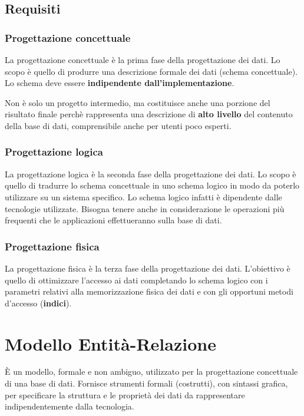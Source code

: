 \documentclass[a4paper]{article}
\begin{document}
\subsection{Requisiti}
\subsubsection{Progettazione concettuale}
La progettazione concettuale è la prima fase della progettazione dei dati. Lo scopo è
quello di produrre una descrizione formale dei dati (schema concettuale). Lo schema
deve essere \textbf{indipendente dall'implementazione}.

\vspace{1em}
\noindent
Non è solo un progetto intermedio, ma costituisce anche una porzione del risultato finale
perchè rappresenta una descrizione di \textbf{alto livello} del contenuto della base di
dati, comprensibile anche per utenti poco esperti.

\subsubsection{Progettazione logica}
La progettazione logica è la seconda fase della progettazione dei dati. Lo scopo è
quello di tradurre lo schema concettuale in uno schema logico in modo da poterlo
utilizzare su un sistema specifico. Lo schema logico infatti è dipendente dalle
tecnologie utilizzate. Bisogna tenere anche in considerazione le operazioni più
frequenti che le applicazioni effettueranno sulla base di dati.

\subsubsection{Progettazione fisica}
La progettazione fisica è la terza fase della progettazione dei dati. L'obiettivo è quello
di ottimizzare l'accesso ai dati completando lo schema logico con i parametri relativi
alla memorizzazione fisica dei dati e con gli opportuni metodi d'accesso (\textbf{indici}).

\section{Modello Entità-Relazione}
È un modello, formale e non ambiguo, utilizzato per la progettazione concettuale di una
base di dati. Fornisce strumenti formali (costrutti), con sintassi grafica, per specificare la
struttura e le proprietà dei dati da rappresentare indipendentemente dalla tecnologia.
\end{document}
